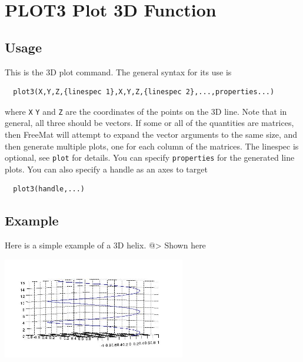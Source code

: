 \section{PLOT3 Plot 3D Function}

\subsection{Usage}

This is the 3D plot command.  The general syntax for its use is
\begin{verbatim}
  plot3(X,Y,Z,{linespec 1},X,Y,Z,{linespec 2},...,properties...)
\end{verbatim}
where \verb|X| \verb|Y| and \verb|Z| are the coordinates of the points on the
3D line.  Note that in general, all three should be vectors.  If
some or all of the quantities are matrices, then FreeMat will attempt
to expand the vector arguments to the same size, and then generate
multiple plots, one for each column of the matrices.  The linespec
is optional, see \verb|plot| for details.  You can specify \verb|properties|
for the generated line plots.  You can also specify a handle as an
axes to target
\begin{verbatim}
  plot3(handle,...)
\end{verbatim}
\subsection{Example}

Here is a simple example of a 3D helix.
@>
Shown here


\centerline{\includegraphics[width=8cm]{plt3}}


